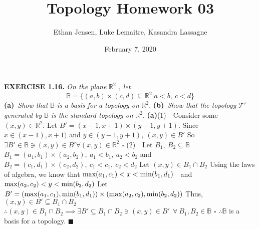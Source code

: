 \documentclass[12pt]{article}
\title{Topology Homework 03}
\author{Ethan Jensen, Luke Lemaitre, Kasandra Lassagne}
\date{February 7, 2020}
\begin{document}
	\maketitle
	\noindent
  \textbf{EXERCISE 1.16.} \textit{On the plane} \(\mathbb{R}^2\) \textit{, let}
	\[\mathbb{B}=\{(a,b)\times (c,d) \subseteq \mathbb{R}^2 | a<b,\ c<d\}\]
	\textbf{(a)}\ \textit{Show that} \(\mathbb{B}\) \textit{is a basis for a topology on} \(\mathbb{R}^2\). \newline
	\textbf{(b)}\ \textit{Show that the topology} \(\mathcal{T}'\) \textit{generated by} \(\mathbb{B}\) \textit{is the standard topology on} \(\mathbb{R}^2\).
	\newline \newline
	\textbf{(a)}\newline (1)\ \ Consider some \((x,y) \in \mathbb{R}^2\). \newline
	Let \(B'=(x-1 , x+1) \times (y-1, y+1)\). \newline
	Since \(x \in (x-1) , x+1)\) and \(y \in (y-1, y+1),\ (x,y) \in B'\) \newline
	So \(\exists B' \in \mathbb{B} \ni (x,y) \in B' \forall (x,y) \in \mathbb{R}^2\)
	\newline \(\square\) \newline
	(2)\ \ Let \(B_1,\ B_2 \subseteq \mathbb{B}\) \newline
	\(B_1 = (a_1, b_1) \times (a_2, b_2),\ a_1 < b_1,\ a_2 < b_2\) and \(B_2 = (c_1, d_1) \times (c_2, d_2),\ c_1 < c_1,\ c_2 < d_2\)
	\newline
	Let \((x,y) \in B_1 \cap B_2\) \newline
	Using the laws of algebra, we know that \newline
	\(\textup{max}(a_1, c_1)< x < \textup{min}(b_1, d_1)\)\ \  and\ \  \(\textup{max}(a_2, c_2) < y < \textup{min}(b_2, d_2)\)
	\newline \newline
	Let \(B'= (\textup{max}(a_1, c_1), \textup{min}(b_1, d_1)) \times (\textup{max}(a_2, c_2), \textup{min}(b_2, d_2))\)
	\newline
	Thus, \((x,y) \in B' \subseteq B_1 \cap B_2\) \newline
	\(\therefore (x,y) \in B_1 \cap B_2 \implies \exists B' \subseteq B_1 \cap B_2 \ni (x,y) \in B'\ \ \forall\  B_1,B_2\in\mathbb{B}\)
	\newline \(\square\) \newline
	\(\therefore \mathbb{B}\) is a basis for a topology.
	\newline \(\blacksquare\) \newline
\end{document}
